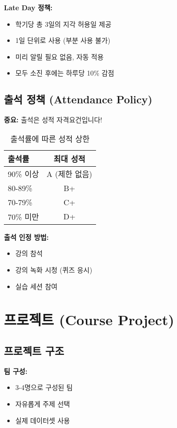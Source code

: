 \documentclass[12pt,a4paper]{article}
\begin{document}
\textbf{Late Day 정책:}
\begin{itemize}
    \item 학기당 총 3일의 지각 허용일 제공
    \item 1일 단위로 사용 (부분 사용 불가)
    \item 미리 알릴 필요 없음, 자동 적용
    \item 모두 소진 후에는 하루당 10\% 감점
\end{itemize}

\subsection{출석 정책 (Attendance Policy)}

\textbf{중요:} 출석은 성적 자격요건입니다!

\begin{table}[h]
\centering
\begin{tabular}{|l|c|}
\hline
\textbf{출석률} & \textbf{최대 성적} \\
\hline
90\% 이상 & A (제한 없음) \\
\hline
80-89\% & B+ \\
\hline
70-79\% & C+ \\
\hline
70\% 미만 & D+ \\
\hline
\end{tabular}
\caption{출석률에 따른 성적 상한}
\end{table}

\textbf{출석 인정 방법:}
\begin{itemize}
    \item 강의 참석
    \item 강의 녹화 시청 (퀴즈 응시)
    \item 실습 세션 참여
\end{itemize}

\section{프로젝트 (Course Project)}

\subsection{프로젝트 구조}

\textbf{팀 구성:}
\begin{itemize}
    \item 3-4명으로 구성된 팀
    \item 자유롭게 주제 선택
    \item 실제 데이터셋 사용
\end{itemize}
\end{document}
